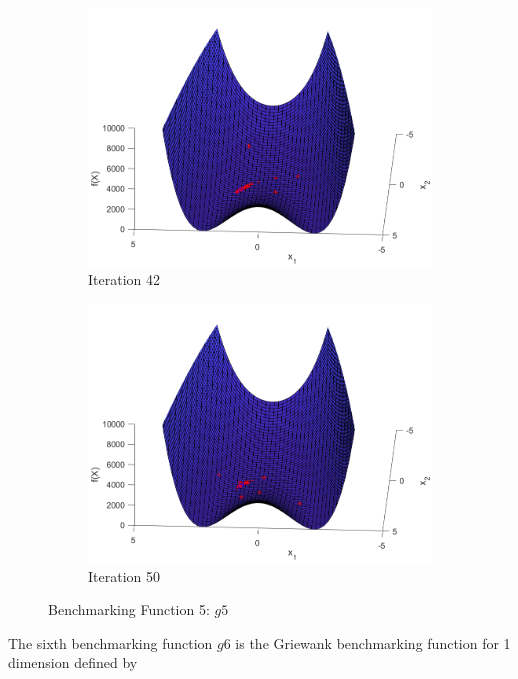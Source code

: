 \begin{figure}
\begin{subfigure}[b]{0.4\textwidth}
    \includegraphics[width=\textwidth]{img/smpl/rosn2d-1-100/loa-iter-42}
    \caption{Iteration 42}
    \label{fig:s3-iter-6}
  \end{subfigure}
  \begin{subfigure}[b]{0.4\textwidth}
    \includegraphics[width=\textwidth]{img/smpl/rosn2d-1-100/loa-iter-50}
    \caption{Iteration 50}
    \label{fig:s3-iter-7}
  \end{subfigure}
  \caption{Benchmarking Function 5: $g5$}
\end{figure}


\par The sixth benchmarking function $g6$ is the Griewank benchmarking function for 1 dimension defined by

